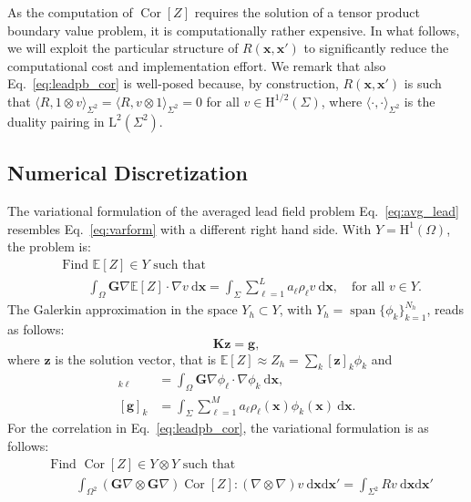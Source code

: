 \documentclass[runningheads]{llncs}
\newcommand{\vx}{\mathbf{x}}
\newcommand{\tG}{\mathbf{G}}
\newcommand{\dd}{\mathrm{d}}
\newcommand{\EE}{\mathbb{E}}
\DeclareMathOperator{\Cor}{Cor}
\begin{document}
As the computation of $\Cor[Z]$ requires the solution of a tensor product
boundary value problem, it is computationally rather expensive. 
In what follows, we will exploit the particular structure of $R(\vx,\vx')$
to significantly reduce the computational cost and implementation effort.
We remark that also Eq.~\eqref{eq:leadpb_cor} is well-posed because, by construction,
$R(\vx,\vx')$ is such that $\langle R,1\otimes v\rangle_{\Sigma^2}=
\langle R,v\otimes 1\rangle_{\Sigma^2}
= 0$ for all \(v\in\mathrm{H}^{1/2}(\Sigma)\),
where $\langle \cdot, \cdot \rangle_{\Sigma^2}$
is the duality pairing in \(\mathrm{L}^2(\Sigma^2)\).

\subsection{Numerical Discretization}
The variational formulation of the averaged lead field
problem Eq.~\eqref{eq:avg_lead} resembles Eq.~\eqref{eq:varform} with a
different right hand side. With $Y=\mathrm{H}^1(\Omega)$, the problem is:
\begin{align*}
&\text{Find $\EE[Z]\in Y$ such that}\\[-0.5em]
&\qquad\int_{\Omega} \tG\nabla \EE[Z] \cdot\nabla v \:\dd\vx = 
\int_{\Sigma} \sum_{\ell=1}^L a_\ell \rho_\ell v\:\dd\vx,
\quad\text{for all $v\in Y$}.  
\end{align*}
The Galerkin approximation in the space $Y_h\subset Y$,
with $Y_h = \operatorname{span}\{ \phi_k\}_{k=1}^{N_h}$,
reads as follows:
\begin{equation}\label{eq:Kzg}
\mathbf{K}\mathbf{z} = \mathbf{g},
\end{equation}
where $\mathbf{z}$ is the solution vector, that is $\EE[Z]\approx Z_h = \sum_k 
[\mathbf{z}]_k \phi_k$ and
\begin{align}
[\mathbf{K}]_{k\ell} &= \int_{\Omega} \tG\nabla \phi_\ell\cdot\nabla \phi_k
\:\dd\vx, \label{eq:Kassemble} \\
[\mathbf{g}]_{k} &= \int_{\Sigma}
\sum_{\ell=1}^M a_\ell\rho_\ell(\vx)\phi_k(\vx)\:\dd\vx. \label{eq:gassemble}
\end{align}
For the correlation in Eq.~\eqref{eq:leadpb_cor}, the variational
formulation is as follows:
\begin{align*}
&\text{Find $\Cor[Z]\in Y\otimes Y$ such that}\\[-0.25em]
&\qquad\int_{\Omega^2} (\tG\nabla\otimes\tG\nabla) \Cor[Z] :
(\nabla\otimes\nabla) v \:\dd\vx\dd\vx' = 
\int_{\Sigma^2} Rv \:\dd\vx\dd\vx'
\end{align*}
\end{document}
